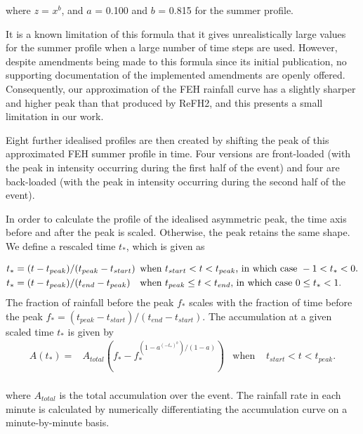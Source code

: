 \documentclass[APA,Times2COL]{WileyNJDv5}
\begin{document}
where \textit{z} = $x^b$, and $a$ = 0.100 and $b$ = 0.815 for the summer profile. 

It is a known limitation of this formula that it gives unrealistically large values for the summer profile when a large number of time steps are used. However, despite amendments being made to this formula since its initial publication, no supporting documentation of the implemented amendments are openly offered. Consequently, our approximation of the FEH rainfall curve has a slightly sharper and higher peak than that produced by ReFH2, and this presents a small limitation in our work. 

Eight further idealised profiles are then created by shifting the peak of this approximated FEH summer profile in time. Four versions are front-loaded (with the peak in intensity occurring during the first half of the event) and four are back-loaded (with the peak in intensity occurring during the second half of the event). 

In order to calculate the profile of the idealised asymmetric peak, the time axis before and after the peak is scaled. Otherwise, the peak retains the same shape. \\
We define a rescaled time $t_*$, which is given as

\begin{align*}
t_*&=(t-t_{peak})/(t_{peak}-t_{start}) & \hspace{-0.3cm}\textrm{ when } & t_{start} <t<t_{peak} \textrm{, in which case } -1<t_*<0. \\
t_*&=(t-t_{peak})/(t_{end}-t_{peak}) & \hspace{-0.3cm} \textrm{ when } & t_{peak} \leq t<t_{end} \textrm{, in which case } 0 \leq t_*<1. 
\end{align*}
The fraction of rainfall before the peak $f_*$ scales with the fraction of time before the peak $f_* = (t_{peak}-t_{start})/(t_{end}-t_{start})$.
The accumulation at a given scaled time $t_*$ is given by
\begin{align*}
A(t_*) = & A_{total}\left(f_*-f_*^{(1-a^{(-t_*)^b})/(1-a)} \right) & \textrm{when } &  t_{start}<t<t_{peak}. \\
\end{align*}

where $A_{total}$ is the total accumulation over the event. The rainfall rate in each minute is calculated by numerically differentiating the accumulation curve on a minute-by-minute basis.
\end{document}
